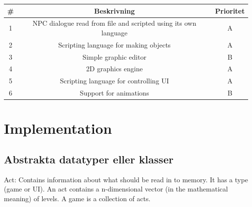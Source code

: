\documentclass[12pt,a4paper]{article}
\begin{document}
\bigskip

\begin{tabular}{|c|c|c|}
\hline
\# & \textbf{Beskrivning} & \textbf{Prioritet} \\ \hline
1 & NPC dialogue read from file and scripted using its own language & A \\ \hline
2 & Scripting language for making objects & A \\ \hline
3 & Simple graphic editor & B \\ \hline
4 & 2D graphics engine & A \\ \hline
5 & Scripting language for controlling UI & A \\ \hline
6 & Support for animations & B \\ \hline
\end{tabular}

\bigskip

\section{Implementation}

\subsection{Abstrakta datatyper eller klasser}

Act: Contains information about what should be read in to memory. It has a type (game or UI). An act contains a n-dimensional vector (in the mathematical meaning) of levels. A game is a collection of acts.
\end{document}
